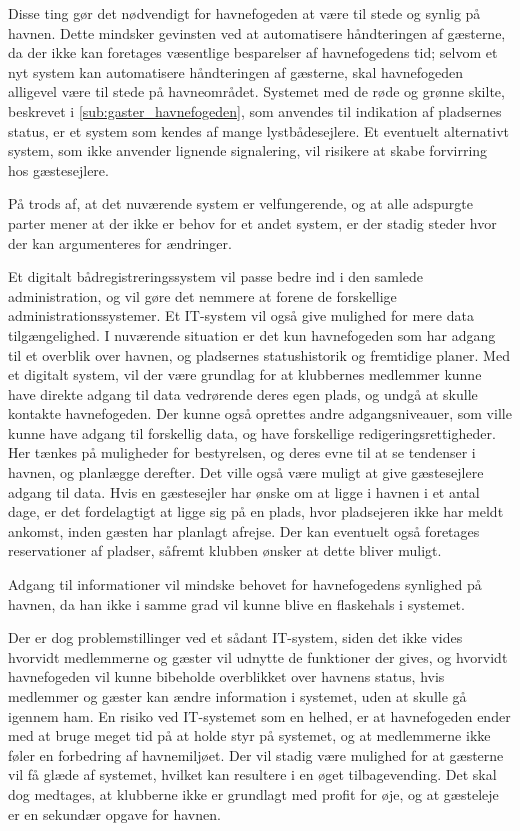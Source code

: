 Disse ting gør det nødvendigt for havnefogeden at være til stede og synlig på havnen. Dette mindsker gevinsten ved at automatisere håndteringen af gæsterne, da der ikke kan foretages væsentlige besparelser af havnefogedens tid; selvom et nyt system kan automatisere håndteringen af gæsterne, skal havnefogeden alligevel være til stede på havneområdet. Systemet med de røde og grønne skilte, beskrevet i \cref{sub:gaster_havnefogeden}, som anvendes til indikation af pladsernes status, er et system som kendes af mange lystbådesejlere. Et eventuelt alternativt system, som ikke anvender lignende signalering, vil risikere at skabe forvirring hos gæstesejlere.

På trods af, at det nuværende system er velfungerende, og at alle adspurgte parter mener at der ikke er behov for et andet system, er der stadig steder hvor der kan argumenteres for ændringer.

Et digitalt bådregistreringssystem vil passe bedre ind i den samlede administration, og vil gøre det nemmere at forene de forskellige administrationssystemer. Et IT-system vil også give mulighed for mere data tilgængelighed. I nuværende situation er det kun havnefogeden som har adgang til et overblik over havnen, og pladsernes statushistorik og fremtidige planer. Med et digitalt system, vil der være grundlag for at klubbernes medlemmer kunne have direkte adgang til data vedrørende deres egen plads, og undgå at skulle kontakte havnefogeden. Der kunne også oprettes andre adgangsniveauer, som ville kunne have adgang til forskellig data, og have forskellige redigeringsrettigheder. Her tænkes på muligheder for bestyrelsen, og deres evne til at se tendenser i havnen, og planlægge derefter. Det ville også være muligt at give gæstesejlere adgang til data. Hvis en gæstesejler har ønske om at ligge i havnen i et antal dage, er det fordelagtigt at ligge sig på en plads, hvor pladsejeren ikke har meldt ankomst, inden gæsten har planlagt afrejse. Der kan eventuelt også foretages reservationer af pladser, såfremt klubben ønsker at dette bliver muligt.

Adgang til informationer vil mindske behovet for havnefogedens synlighed på havnen, da han ikke i samme grad vil kunne blive en flaskehals i systemet.

Der er dog problemstillinger ved et sådant IT-system, siden det ikke vides hvorvidt medlemmerne og gæster vil udnytte de funktioner der gives, og hvorvidt havnefogeden vil kunne bibeholde overblikket over havnens status, hvis medlemmer og gæster kan ændre information i systemet, uden at skulle gå igennem ham. En risiko ved IT-systemet som en helhed, er at havnefogeden ender med at bruge meget tid på at holde styr på systemet, og at medlemmerne ikke føler en forbedring af havnemiljøet. Der vil stadig være mulighed for at gæsterne vil få glæde af systemet, hvilket kan resultere i en øget tilbagevending. Det skal dog medtages, at klubberne ikke er grundlagt med profit for øje, og at gæsteleje er en sekundær opgave for havnen.

